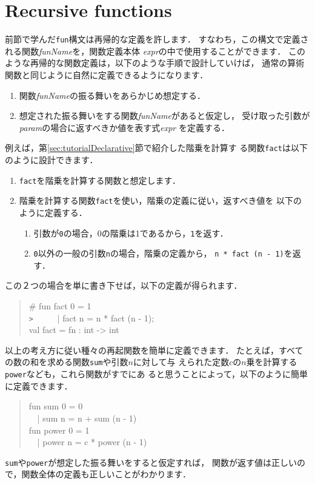 \documentclass{jbook}
\newcommand{\txt}[2]{#2}
\begin{document}
\fi%


\section{\txt{再帰的な関数}{Recursive functions}}
\label{sec:tutorialRecursion}

\ifjp%
	前節で学んだ{\tt fun}構文は再帰的な定義を許します．
	すなわち，この構文で定義される関数{\it funName}を，関数定義本体
{\it expr}の中で使用することができます．
	このような再帰的な関数定義は，以下のような手順で設計していけば，
通常の算術関数と同じように自然に定義できるようになります．
\begin{enumerate}
\item 関数{\it funName}の振る舞いをあらかじめ想定する．
\item 想定された振る舞いをする関数{\it funName}があると仮定し，
受け取った引数が{\it param}の場合に返すべきか値を表す式{\it expr}
を定義する．
\end{enumerate}
	例えば，第\ref{sec:tutorialDeclarative}節で紹介した階乗を計算す
る関数{\tt fact}は以下のように設計できます．
\begin{enumerate}
\item {\tt fact}を階乗を計算する関数と想定します．
\item 階乗を計算する関数{\tt fact}を使い，階乗の定義に従い，返すべき値を
以下のように定義する．
\begin{enumerate}
\item 引数が{\tt 0}の場合，0の階乗は1であるから，{\tt 1}を返す．
\item {\tt 0}以外の一般の引数{\tt n}の場合，階乗の定義から，
{\tt n * fact (n - 1)}を返す．
\end{enumerate}
\end{enumerate}
	この２つの場合を単に書き下せば，以下の定義が得られます．
\begin{tt}
\begin{quote}
\# fun fact 0 = 1\\
\verb|>| \ \ \ \ \ | fact n = n * fact (n - 1);\\
val fact = fn : int -> int
\end{quote}
\end{tt}

	以上の考え方に従い種々の再起関数を簡単に定義できます．
	たとえば，すべての数の和を求める関数{\tt sum}や引数$n$に対して与
えられた定数$c$の$n$乗を計算する{\tt power}なども，これら関数がすでにあ
ると思うことによって，以下のように簡単に定義できます．
\begin{tt}
\begin{quote}
fun sum 0 = 0\\
\ \ | sum n = n + sum (n - 1)\\
fun power 0 = 1\\
\ \ | power n = c * power (n - 1)
\end{quote}
\end{tt}
	{\tt sum}や{\tt power}が想定した振る舞いをすると仮定すれば，
関数が返す値は正しいので，関数全体の定義も正しいことがわかります．
\end{document}
